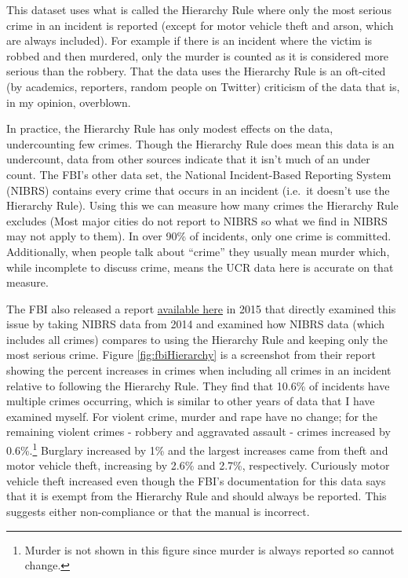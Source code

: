 \documentclass[
  12pt,
  openany]{book}
\begin{document}
This dataset uses what is called the Hierarchy Rule where only the most serious crime in an incident is reported (except for motor vehicle theft and arson, which are always included). For example if there is an incident where the victim is robbed and then murdered, only the murder is counted as it is considered more serious than the robbery. That the data uses the Hierarchy Rule is an oft-cited (by academics, reporters, random people on Twitter) criticism of the data that is, in my opinion, overblown.

In practice, the Hierarchy Rule has only modest effects on the data, undercounting few crimes. Though the Hierarchy Rule does mean this data is an undercount, data from other sources indicate that it isn't much of an under count. The FBI's other data set, the National Incident-Based Reporting System (NIBRS) contains every crime that occurs in an incident (i.e.~it doesn't use the Hierarchy Rule). Using this we can measure how many crimes the Hierarchy Rule excludes (Most major cities do not report to NIBRS so what we find in NIBRS may not apply to them). In over 90\% of incidents, only one crime is committed. Additionally, when people talk about ``crime'' they usually mean murder which, while incomplete to discuss crime, means the UCR data here is accurate on that measure.

The FBI also released a report \href{https://ucr.fbi.gov/nibrs/2014/resource-pages/effects_of_nibrs_on_crime_statistics_final.pdf}{available here} in 2015 that directly examined this issue by taking NIBRS data from 2014 and examined how NIBRS data (which includes all crimes) compares to using the Hierarchy Rule and keeping only the most serious crime. Figure \ref{fig:fbiHierarchy} is a screenshot from their report showing the percent increases in crimes when including all crimes in an incident relative to following the Hierarchy Rule. They find that 10.6\% of incidents have multiple crimes occurring, which is similar to other years of data that I have examined myself. For violent crime, murder and rape have no change; for the remaining violent crimes - robbery and aggravated assault - crimes increased by 0.6\%.\footnote{Murder is not shown in this figure since murder is always reported so cannot change.} Burglary increased by 1\% and the largest increases came from theft and motor vehicle theft, increasing by 2.6\% and 2.7\%, respectively. Curiously motor vehicle theft increased even though the FBI's documentation for this data says that it is exempt from the Hierarchy Rule and should always be reported. This suggests either non-compliance or that the manual is incorrect.
\end{document}
